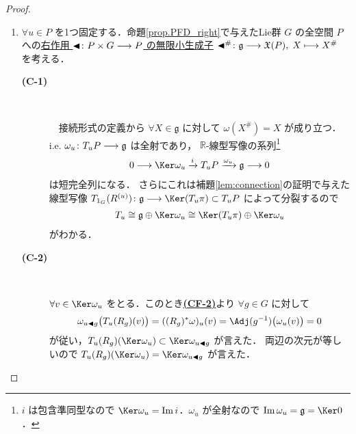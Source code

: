\documentclass[TQFT_main]{subfiles}
\begin{document}
\begin{proof}
    \begin{enumerate}
        \item 
        $\forall u \in P$ を1つ固定する．命題\ref{prop.PFD_right}で与えたLie群 $G$ の全空間 $P$ への\hyperref[def:fundamental-vecf]{右作用 $\blacktriangleleft \colon P \times G \longrightarrow P$ の無限小生成子} $\blacktriangleleft^\# \colon \mathfrak{g} \longrightarrow \mathfrak{X}(P),\; X \longmapsto X^\#$ を考える．
        \begin{description}
            \item[\textbf{(C-1)}]　
            
            　接続形式の定義から $\forall X \in \mathfrak{g}$ に対して $\omega (X^\#) = X$ が成り立つ．i.e. $\omega_{u} \colon T_{u}P \longrightarrow \mathfrak{g}$ は全射であり，
            $\mathbb{R}$-線型写像の系列\footnote{$i$ は包含準同型なので $\Ker \omega_{u} = \Im i$．$\omega_{u}$ が全射なので $\Im \omega_{u} = \mathfrak{g} = \Ker 0$．}
            \begin{align}
                0 \lto \Ker \omega_{u} \xrightarrow{i} T_{u} P \xrightarrow{\omega_{u}} \mathfrak{g} \lto 0
            \end{align}
            は短完全列になる．
            さらにこれは補題\ref{lem:connection}の証明で与えた線型写像 $T_{1_G} (R^{(u)}) \colon \mathfrak{g} \lto \Ker (T_{u} \pi) \subset T_{u}P$ によって分裂するので
            \begin{align}
                T_{u} \cong \mathfrak{g} \oplus \Ker \omega_{u} \cong \Ker (T_{u} \pi) \oplus \Ker \omega_{u}
            \end{align}
            がわかる．

            \item[\textbf{(C-2)}]　
            
            $\forall v \in \Ker \omega_{u}$ をとる．このとき\hyperref[def:connection]{\textbf{\textsf{(CF-2)}}}より $\forall g \in G$ に対して
            \begin{align}
                \omega_{u \btl g} \bigl( T_{u}(R_g)(v) \bigr) = ((R_g)^* \omega)_{u} (v) = \Adj (g^{-1})\bigl(\omega_{u}(v)\bigr) = 0
            \end{align}
            が従い，$T_{u}(R_g)(\Ker \omega_{u}) \subset \Ker \omega_{u \btl g}$ が言えた．
            両辺の次元が等しいので $T_u(R_g)(\Ker \omega_u) = \Ker \omega_{u \btl g}$ が言えた．
        \end{description}


\end{enumerate}
\end{proof}
\end{document}
